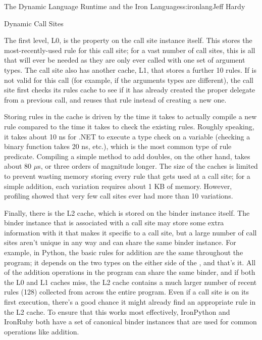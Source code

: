 \begin{aosachapter}{The Dynamic Language Runtime and the Iron Languages}{s:ironlang}{Jeff Hardy}
\begin{aosasect1}{Dynamic Call Sites}

The first level, L0, is the  property on the call site
instance itself. This stores the most-recently-used rule for this call site;
for a vast number of call sites, this is all that will ever be needed as they
are only ever called with one set of argument types. The call site also has
another cache, L1, that stores a further 10 rules. If  is not
valid for this call (for example, if the arguments types are different), the
call site first checks its rules cache to see if it has already created the
proper delegate from a previous call, and reuses that rule instead of creating
a new one.

Storing rules in the cache is driven by the time it takes to actually compile a
new rule compared to the time it takes to check the existing rules. Roughly
speaking, it takes about 10 ns for .NET to execute a type check on a variable
(checking a binary function takes 20 ns, etc.), which is the most common type
of rule predicate. Compiling a simple method to add doubles, on the other hand,
takes about 80 $\mu$s, or three orders of magnitude longer. The size of the caches
is limited to prevent wasting memory storing every rule that gets used at a
call site; for a simple addition, each variation requires about 1 KB of memory.
However, profiling showed that very few call sites ever had more than 10
variations.

Finally, there is the L2 cache, which is stored on the binder instance itself.
The binder instance that is associated with a call site may store some extra
information with it that makes it specific to a call site, but a large number
of call sites aren't unique in any way and can share the same binder instance.
For example, in Python, the basic rules for addition are the same throughout
the program; it depends on the two types on the either side of the \code{+},
and that's it. All of the addition operations in the program can share the same
binder, and if both the L0 and L1 caches miss, the L2 cache contains a much
larger number of recent rules (128) collected from across the entire program.
Even if a call site is on its first execution, there's a good chance it might
already find an appropriate rule in the L2 cache. To ensure that this works
most effectively, IronPython and IronRuby both have a set of canonical binder
instances that are used for common operations like addition.


\end{aosasect1}
\end{aosachapter}
